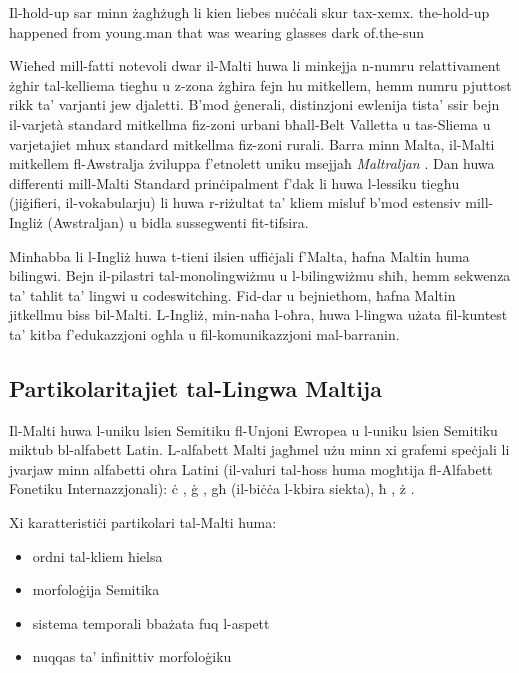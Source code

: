 \documentclass[]{../../metanetpaper}
\begin{document}
\begin{multicols}{2}
\begin{examples}
\item
\gll Il-ħold-up sar minn żagħżugħ li kien liebes nuċċali skur tax-xemx.
the-hold-up happened from young.man that was wearing glasses dark of.the-sun
\glend
\end{examples}

Wieħed mill-fatti notevoli dwar il-Malti huwa li minkejja n-numru relattivament żgħir tal-kelliema tiegħu u z-zona żgħira fejn hu mitkellem, hemm numru pjuttost rikk ta’ varjanti jew djaletti. B’mod ġenerali, distinzjoni ewlenija tista’ ssir bejn il-varjetà standard mitkellma fiz-zoni urbani bħall-Belt Valletta u tas-Sliema u varjetajiet mhux standard mitkellma fiz-zoni rurali. Barra minn Malta, il-Malti mitkellem fl-Awstralja żviluppa f’etnolett uniku msejjaħ \emph{Maltraljan} \cite{Bovingdon:2001}. Dan huwa differenti mill-Malti Standard prinċipalment f'dak li huwa l-lessiku tiegħu (jiġifieri, il-vokabularju) li huwa r-riżultat ta’ kliem misluf b’mod estensiv mill- Ingliż (Awstraljan) u bidla sussegwenti fit-tifsira. 

Minħabba li l-Ingliż huwa t-tieni ilsien uffiċjali f'Malta, ħafna Maltin huma bilingwi. Bejn il-pilastri tal-monolingwiżmu u l-bilingwiżmu sħiħ, hemm sekwenza ta’ taħlit ta’ lingwi u codeswitching. Fid-dar u bejniethom, ħafna Maltin jitkellmu biss bil-Malti. L-Ingliż, min-naħa l-oħra, huwa l-lingwa użata fil-kuntest ta’ kitba f’edukazzjoni ogħla u fil-komunikazzjoni mal-barranin.


\subsection{Partikolaritajiet tal-Lingwa Maltija}

Il-Malti huwa l-uniku lsien Semitiku fl-Unjoni Ewropea u l-uniku lsien Semitiku miktub bl-alfabett Latin. L-alfabett Malti jagħmel użu minn xi grafemi speċjali li jvarjaw minn alfabetti oħra Latini (il-valuri tal-ħoss huma mogħtija fl-Alfabett Fonetiku Internazzjonali): 
ċ , ġ , għ (il-biċċa l-kbira siekta), ħ , ż . \cite{Fabri:2011a,Borg-Alexander:1997}

Xi karatteristiċi partikolari tal-Malti huma:

\begin{itemize}
\item ordni tal-kliem ħielsa  
\item morfoloġija Semitika
\item sistema temporali bbażata fuq l-aspett  
\item nuqqas ta’ infinittiv morfoloġiku
\end{itemize}


\end{multicols}
\end{document}
